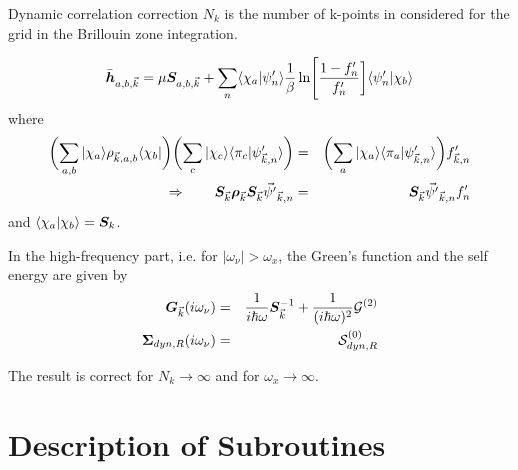 \documentclass[11pt,a4paper]{report}
\begin{document}
\begin{myshadowminipage}{Dynamic correlation correction}
$N_k$ is the number of k-points in considered for the grid in the
Brillouin zone integration.

\begin{eqnarray}
\bar{\bm{h}}_{a,b,\vec{k}}=
\mu\bm{S}_{a,b,\vec{k}}+
\sum_n\langle\chi_a|\psi'_n\rangle\frac{1}{\beta}
\ln\Biggl[\frac{1-f'_n}{f'_n}\biggr]\langle\psi'_n|\chi_b\rangle
\end{eqnarray}
where
\begin{eqnarray}
\biggl(\sum_{a,b}|\chi_a\rangle\rho_{\vec{k},a,b}\langle\chi_b|\biggr)
\biggl(\sum_c|\chi_c\rangle\langle\pi_c|\psi'_{\vec{k},n}\rangle\biggr)
&=&\biggl(\sum_a|\chi_a\rangle\langle\pi_a|\psi'_{\vec{k},n}\rangle\biggr) 
f'_{\vec{k},n}
\nonumber\\
\Rightarrow\qquad
\bm{S}_{\vec{k}}\bm{\rho}_{\vec{k}}\bm{S}_{\vec{k}} \vec{\psi'}_{\vec{k},n}
&=&\bm{S}_{\vec{k}}\vec{\psi'}_{\vec{k},n} f'_n
\end{eqnarray}
and $\langle\chi_a|\chi_b\rangle=\bm{S}_{k}$.

In the high-frequency part, i.e. for $|\omega_\nu|>\omega_x$, the
Green's function and the self energy are given by
\begin{eqnarray}
\bm{G}_{\vec{k}}(i\omega_\nu)&=&\frac{1}{i\hbar\omega}\bm{S}^{-1}_{\vec{k}}
+\frac{1}{(i\hbar\omega)^2}\mathcal{\bm{G}}^{(2)}
\nonumber\\
\bm{\Sigma}_{dyn,R}(i\omega_\nu)&=&\mathcal{\bm{S}}^{(0)}_{dyn,R}
\end{eqnarray}

The result is correct for $N_k\rightarrow\infty$ and for
$\omega_x\rightarrow\infty$.
\end{myshadowminipage}


\section{Description of Subroutines}


\end{document}
